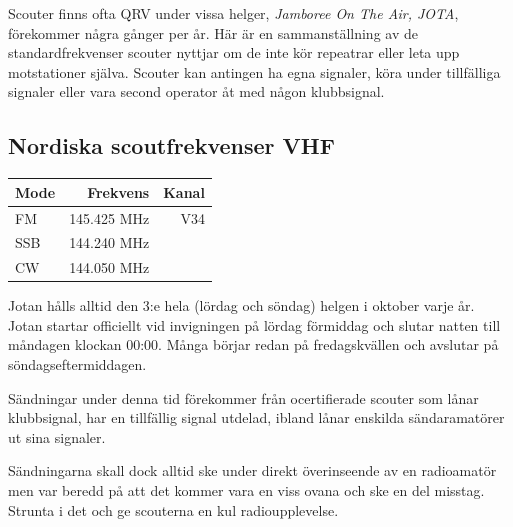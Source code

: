 Scouter finns ofta QRV under vissa helger, \textit{Jamboree On The Air, JOTA}, förekommer några gånger per år. Här är en sammanställning av de standardfrekvenser scouter nyttjar om de inte kör repeatrar eller leta upp motstationer själva. Scouter kan antingen ha egna signaler, köra under
tillfälliga signaler eller vara second operator åt med någon klubbsignal.

\subsection{Nordiska scoutfrekvenser VHF}

\begin{center}
\begin{tabular}{lrr}
	\textbf{Mode} & \textbf{Frekvens} & \textbf{Kanal} \\ \hline
	FM            &      145.425  MHz &   V34 \\
	SSB           &      144.240  MHz &  \\
	CW            &      144.050  MHz &
\end{tabular}
\end{center}

Jotan hålls alltid den 3:e hela (lördag och söndag) helgen i oktober varje år. Jotan startar officiellt vid invigningen på lördag förmiddag och slutar natten till måndagen klockan 00:00. Många börjar redan på fredagskvällen och avslutar på söndagseftermiddagen.

Sändningar under denna tid förekommer från ocertifierade scouter som lånar 
klubbsignal, har en tillfällig signal utdelad, ibland lånar enskilda 
sändaramatörer ut sina signaler. 

Sändningarna skall dock alltid ske under direkt överinseende av en radioamatör 
men var beredd på att det kommer vara en viss ovana och ske en del misstag. 
Strunta i det och ge scouterna en kul radioupplevelse.


